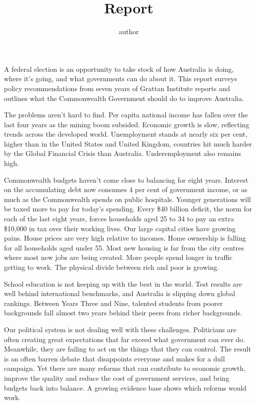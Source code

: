 \documentclass[continuous]{grattan}
\title{Report}
\author{author}
\begin{document}
\contentspage

\listoffigures

\begin{overview}[-40pt]
A federal election is an opportunity to take stock of how Australia
is doing, where it’s going, and what governments can do about it.
This report surveys policy recommendations from seven years of
Grattan Institute reports and outlines what the Commonwealth
Government should do to improve Australia.

The problems aren’t hard to find. Per capita national income has
fallen over the last four years as the mining boom subsided.
Economic growth is slow, reflecting trends across the developed
world. Unemployment stands at nearly six per cent, higher than in
the United States and United Kingdom, countries hit much harder
by the Global Financial Crisis than Australia. Underemployment
also remains high.

Commonwealth budgets haven’t come close to balancing for eight
years. Interest on the accumulating debt now consumes 4 per
cent of government income, or as much as the Commonwealth
spends on public hospitals. Younger generations will be taxed
more to pay for today’s spending. Every \$40 billion deficit, the
norm for each of the last eight years, forces households aged 25
to 34 to pay an extra \$10,000 in tax over their working lives.
Our large capital cities have growing pains. House prices are very
high relative to incomes. Home ownership is falling for all
households aged under 55. Most new housing is far from the city
centres where most new jobs are being created. More people
spend longer in traffic getting to work. The physical divide
between rich and poor is growing.

School education is not keeping up with the best in the world. Test
results are well behind international benchmarks, and Australia is
slipping down global rankings. Between Years Three and Nine,
talented students from poorer backgrounds fall almost two years
behind their peers from richer backgrounds.

Our political system is not dealing well with these challenges.
Politicians are often creating great expectations that far exceed
what government can ever do. Meanwhile, they are failing to act
on the things that they can control. The result is an often barren
debate that disappoints everyone and makes for a dull campaign.
Yet there are many reforms that can contribute to economic
growth, improve the quality and reduce the cost of government
services, and bring budgets back into balance. A growing
evidence base shows which reforms would work.


\end{overview}
\end{document}
